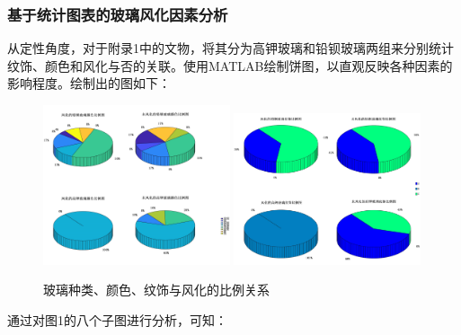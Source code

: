 \documentclass{my_paper}
\begin{document}
\subsubsection{基于统计图表的玻璃风化因素分析}
从定性角度，对于附录1中的文物，将其分为高钾玻璃和铅钡玻璃两组来分别统计纹饰、颜色和风化与否的关联。使用MATLAB绘制饼图，以直观反映各种因素的影响程度。绘制出的图如下：
\begin{figure}[H]
\centering 
\includegraphics[width=0.49\textwidth]{饼图1.jpg} 
\includegraphics[width=0.49\textwidth]{饼图2.jpg} 
\caption{玻璃种类、颜色、纹饰与风化的比例关系} 
\end{figure}

通过对图1的八个子图进行分析，可知：
\end{document}
